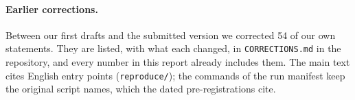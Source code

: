 \paragraph{Earlier corrections.} Between our first drafts and the submitted version we corrected 54 of our own statements. They are listed, with what each changed, in \texttt{CORRECTIONS.md} in the repository, and every number in this report already includes them. The main text cites English entry points (\texttt{reproduce/}); the commands of the run manifest keep the original script names, which the dated pre-registrations cite.
